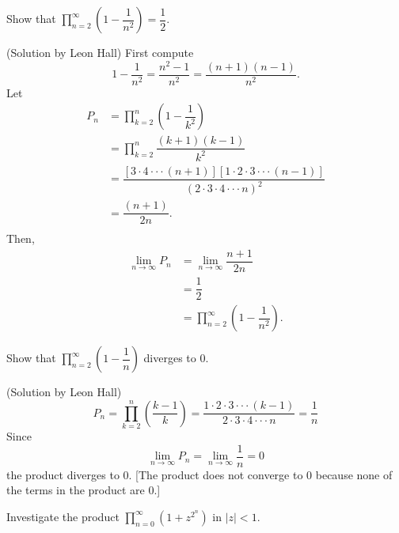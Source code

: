 \newpage
\begin{problem}\label{problem2chapter1}
Show that $\displaystyle\prod_{n=2}^{\infty} \left( 1 - \dfrac{1}{n^2} \right) = \dfrac{1}{2}$.
\end{problem}
\begin{solution}(Solution by Leon Hall)
First compute
$$1 - \dfrac{1}{n^2} = \dfrac{n^2-1}{n^2} = \dfrac{(n+1)(n-1)}{n^2}.$$
Let
$$\begin{array}{ll}
P_n &= \displaystyle\prod_{k=2}^n \left( 1 - \dfrac{1}{k^2} \right) \\
&= \displaystyle\prod_{k=2}^n \dfrac{(k+1)(k-1)}{k^2} \\
&= \dfrac{[3 \cdot 4 \cdot  \cdot  \cdot (n+1)][1 \cdot 2 \cdot 3 \cdot  \cdot  \cdot (n-1)]}{(2 \cdot 3 \cdot 4 \cdot  \cdot  \cdot n)^2} \\
&= \dfrac{(n+1)}{2n}. \\
\end{array}$$
Then,
$$\begin{array}{ll}
\displaystyle\lim_{n \rightarrow \infty} P_n &= \displaystyle\lim_{n \rightarrow \infty} \dfrac{n+1}{2n} \\ 
&= \dfrac{1}{2} \\
&= \displaystyle\prod_{n=2}^{\infty} \left( 1 - \dfrac{1}{n^2} \right).
\end{array}$$
\end{solution}
\begin{problem}\label{problem3chapter1}
Show that $\displaystyle\prod_{n=2}^{\infty} \left( 1 - \dfrac{1}{n} \right)$ diverges to $0$.
\end{problem}
\begin{solution}(Solution by Leon Hall)
$$P_n = \displaystyle\prod_{k=2}^n \left( \dfrac{k-1}{k} \right) = \dfrac{1 \cdot 2 \cdot 3 \cdot  \cdot  \cdot (k-1)}{2 \cdot 3 \cdot 4  \cdot  \cdot  \cdot  n} = \dfrac{1}{n}$$
Since
$$\displaystyle\lim_{n \rightarrow \infty} P_n = \displaystyle\lim_{n \rightarrow \infty} \dfrac{1}{n} = 0$$
the product diverges to $0$. [The product does not converge to $0$ because none of the terms in the product are $0$.]
\end{solution}
\begin{problem}\label{problem4chapter1}
Investigate the product $\displaystyle\prod_{n=0}^{\infty} (1 + z^{2^n})$ in $|z| < 1$.
\end{problem}
